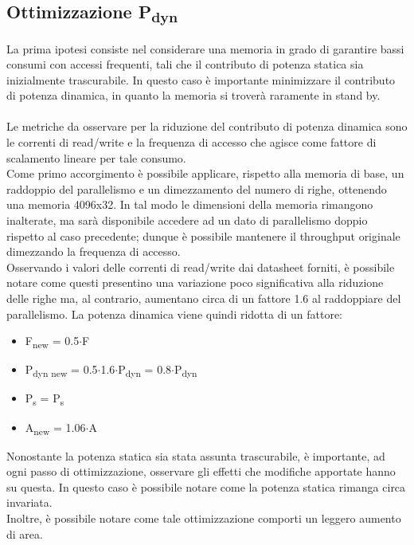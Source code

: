 \documentclass[11pt,  english, makeidx, a4paper, titlepage, oneside]{book}
\begin{document}
\subsection{Ottimizzazione P\textsubscript{dyn}}
La prima ipotesi consiste nel considerare una memoria in grado di garantire bassi consumi con accessi frequenti, tali che il contributo di potenza statica sia inizialmente trascurabile. In questo caso è importante minimizzare il contributo di potenza dinamica, in quanto la memoria si troverà raramente in stand by.
\\\\
Le metriche da osservare per la riduzione del contributo di potenza dinamica sono le correnti di read/write e la frequenza di accesso che agisce come fattore di scalamento lineare per tale consumo.
\\
Come primo accorgimento è possibile applicare, rispetto alla memoria di base, un raddoppio del parallelismo e un dimezzamento del numero di righe, ottenendo una memoria 4096x32. In tal modo le dimensioni della memoria rimangono inalterate, ma sarà disponibile accedere ad un dato di parallelismo doppio rispetto al caso precedente; dunque è possibile mantenere il throughput originale dimezzando la frequenza di accesso.
\\
Osservando i valori delle correnti di read/write dai datasheet forniti, è possibile notare come questi presentino una variazione poco significativa alla riduzione delle righe ma, al contrario, aumentano circa di un fattore 1.6 al raddoppiare del parallelismo. La potenza dinamica viene quindi ridotta di un fattore:
\\
\begin{itemize}
\item F\textsubscript{new} = 0.5$\cdot$F
\item P\textsubscript{dyn new} = 0.5$\cdot$1.6$\cdot$P\textsubscript{dyn} = 0.8$\cdot$P\textsubscript{dyn}
\item P\textsubscript{s} = P\textsubscript{s}
\item A\textsubscript{new} = 1.06$\cdot$A
\end{itemize}
\vspace{0.3cm}
Nonostante la potenza statica sia stata assunta trascurabile, è importante, ad ogni passo di ottimizzazione, osservare gli effetti che modifiche apportate hanno su questa. In questo caso è possibile notare come la potenza statica rimanga circa invariata.
\\
Inoltre, è possibile notare come tale ottimizzazione comporti un leggero aumento di area.
\end{document}
